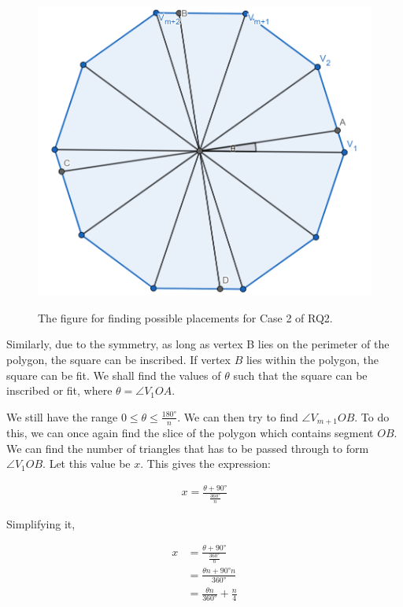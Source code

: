 \documentclass[12pt]{scrartcl}
\begin{document}
\begin{figure}[htpb]
	\centering
	\includegraphics[scale=.75]{images/rq2_2_1.jpg}
	\label{fig:rq2_2_1_img}
	\caption{The figure for finding possible placements for Case 2 of RQ2.}
\end{figure}

Similarly, due to the symmetry, as long as vertex B lies on the perimeter of the polygon, the square can be inscribed.
If vertex $B$ lies within the polygon, the square can be fit. We shall find the values of $\theta$ such that the square can be inscribed or fit,
where $\theta = \angle V_{1}OA$.

We still have the range $0 \leq \theta \leq \frac{\ang{180}}{n}$.
We can then try to find $\angle V_{m+1}OB$. To do this, we can once again find the slice of the polygon which contains segment $OB$. We can find the number of triangles that has to be passed through to form $\angle V_{1}OB$. Let this value be $x$. This gives the expression:

\begin{align*}
	x = \frac{\theta + \ang{90}}{\frac{\ang{360}}{n}}
\end{align*}

Simplifying it,

\begin{align*}
	x & = \frac{\theta + \ang{90}}{\frac{\ang{360}}{n}} \\
	  & = \frac{\theta n + \ang{90} n}{\ang{360}}       \\
	  & = \frac{\theta n}{\ang{360}} + \frac{n}{4}
\end{align*}
\end{document}
